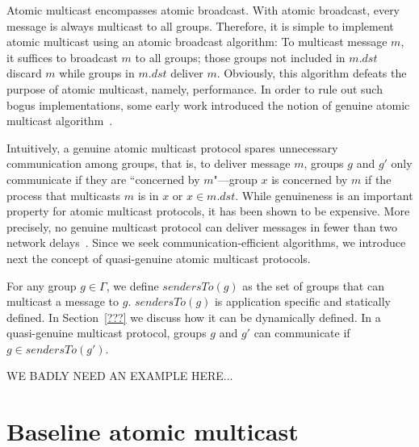 \documentclass[times, 10pt]{article}
\begin{document}
Atomic multicast encompasses atomic broadcast. With atomic broadcast, every message is always multicast to all groups. Therefore, it is simple to implement atomic multicast using an atomic broadcast algorithm: To multicast message $m$, it suffices to broadcast $m$ to all groups; those groups not included in $m.dst$ discard $m$ while groups in $m.dst$ deliver $m$. Obviously, this algorithm defeats the purpose of atomic multicast, namely, performance. In order to rule out such bogus implementations, some early work introduced the notion of genuine atomic multicast algorithm~\cite{andre&rachid}.

Intuitively, a genuine atomic multicast protocol spares unnecessary communication among groups, that is, to deliver message $m$, groups $g$ and $g'$ only communicate if they are ``concerned by $m$"---group $x$ is concerned by $m$ if the process that multicasts $m$ is in $x$ or $x \in m.dst$.
While genuineness is an important property for atomic multicast protocols, it has been shown to be expensive. More precisely, no genuine multicast protocol can deliver messages in fewer than two network delays~\cite{nicolas&fernando}. Since we seek communication-efficient algorithms, we introduce next the concept of quasi-genuine atomic multicast protocols.

For any group $g \in \Gamma$, we define $sendersTo(g)$ as the set of groups that can multicast a message to $g$. $sendersTo(g)$ is application specific and statically defined. In Section~\ref{???} we discuss how it can be dynamically defined. In a quasi-genuine multicast protocol, groups $g$ and $g'$ can communicate if $g \in sendersTo(g')$.

WE BADLY NEED AN EXAMPLE HERE...



\section{Baseline atomic multicast}
\label{sec:baseline}
\end{document}
